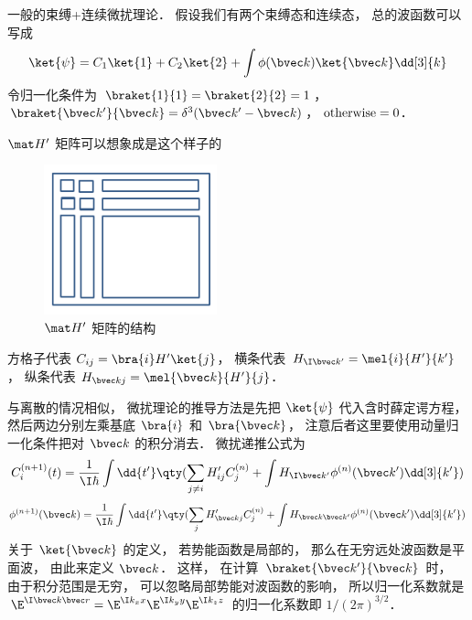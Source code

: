 

一般的束缚+连续微扰理论． 假设我们有两个束缚态和连续态， 总的波函数可以写成
 \begin{equation}
\ket{\psi} = C_1\ket{1} + C_2\ket{2} + \int \phi (\bvec k)\ket{\bvec k} \dd[3]{k}
\end{equation}
令归一化条件为 $\braket{1}{1} = \braket{2}{2} = 1$，  $\braket{\bvec k'}{\bvec k}  = \delta ^3 (\bvec k' - \bvec k)$，  $\rm{otherwise} = 0$． 

 $\mat H'$  矩阵可以想象成是这个样子的
\begin{figure}[ht]
\centering
\includegraphics[width=5cm]{./figures/PTCont1.pdf}
\caption{$\mat H'$ 矩阵的结构} 
\end{figure}

方格子代表 $C_{ij} = \bra{i} H' \ket{j}$， 横条代表 $H_{\I\bvec k'} = \mel{i}{H'}{k'}$，  纵条代表 $H_{\bvec k j} = \mel{\bvec k}{H'}{j}$． 

与离散的情况相似， 微扰理论的推导方法是先把 $\ket{\psi}$ 代入含时薛定谔方程， 然后两边分别左乘基底 $\bra{i}$ 和 $\bra{\bvec k}$，  注意后者这里要使用动量归一化条件把对 $\bvec k$ 的积分消去． 微扰递推公式为
 \begin{equation}
C_i^{(n + 1)}(t) = \frac{1}{\I\hbar} \int \dd{t'} \qty(\sum_{j \ne i} H'_{ij} C_j^{(n)} + \int H_{\I\bvec k'} \phi ^{(n)} (\bvec k') \dd[3]{k'} )
\end{equation}
\begin{equation}
\phi^{(n+1)}(\bvec k) = \frac{1}{\I\hbar} \int \dd{t'} \qty(\sum_j H'_{\bvec kj} C_j^{(n)} + \int H_{\bvec k\bvec k'} \phi ^{(n)}(\bvec k') \dd[3]{k'})
\end{equation}
关于 $\ket{\bvec k}$  的定义， 若势能函数是局部的， 那么在无穷远处波函数是平面波， 由此来定义 $\bvec k$．  这样， 在计算 $\braket{\bvec k'}{\bvec k}$ 时， 由于积分范围是无穷， 可以忽略局部势能对波函数的影响， 所以归一化系数就是 $\E^{\I \bvec k\bvec r} = \E^{\I k_x x} \E^{\I k_y y} \E^{\I k_z z}$ 的归一化系数即 $1/{(2\pi )^{3/2}}$． 
 

